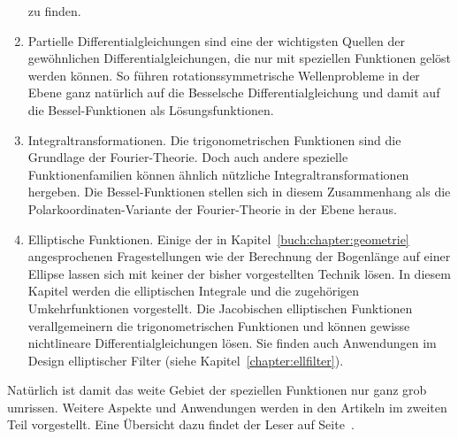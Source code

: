 \begin{enumerate}
zu finden.
\item
Partielle Differentialgleichungen sind eine der wichtigsten Quellen
der gewöhnlichen Differentialgleichungen, die nur mit speziellen
Funktionen gelöst werden können.
So führen rotationssymmetrische Wellenprobleme in der Ebene
ganz natürlich auf die Besselsche Differentialgleichung und damit
auf die Bessel-Funktionen als Lösungsfunktionen.
\item
Integraltransformationen.
Die trigonometrischen Funktionen sind die Grundlage der Fourier-Theorie.
Doch auch andere spezielle Funktionenfamilien können ähnlich
nützliche Integraltransformationen hergeben.
Die Bessel-Funktionen stellen sich in diesem Zusammenhang als die
Polarkoordinaten-Variante der Fourier-Theorie in der Ebene heraus.
\item
Elliptische Funktionen.
Einige der in Kapitel~\ref{buch:chapter:geometrie} angesprochenen
Fragestellungen wie der Berechnung der Bogenlänge auf einer Ellipse
lassen sich mit keiner der bisher vorgestellten Technik lösen.
In diesem Kapitel werden die elliptischen Integrale und die
zugehörigen Umkehrfunktionen vorgestellt.
Die Jacobischen elliptischen Funktionen verallgemeinern
die trigonometrischen Funktionen und können gewisse nichtlineare 
Differentialgleichungen lösen.
Sie finden auch Anwendungen im Design elliptischer Filter
(siehe Kapitel~\ref{chapter:ellfilter}).
\end{enumerate}

Natürlich ist damit das weite Gebiet der speziellen Funktionen
nur ganz grob umrissen.
Weitere Aspekte und Anwendungen werden in den Artikeln im zweiten
Teil vorgestellt.
Eine Übersicht dazu findet der Leser auf Seite~\pageref{buch:uebersicht}.

